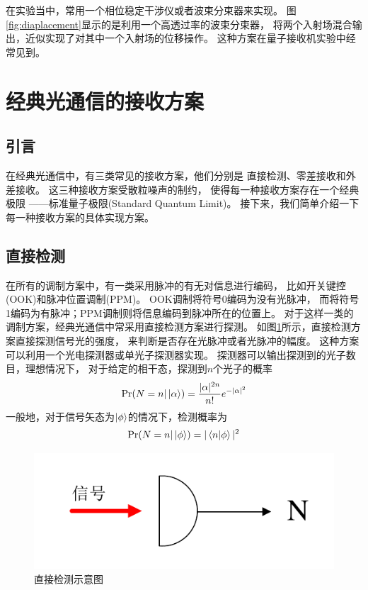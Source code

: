 在实验当中，常用一个相位稳定干涉仪或者波束分束器来实现\cite{cook2007optical,becerra2013experimental,lau2006binary,paris1996displacement}。
图\ref{fig:diaplacement}显示的是利用一个高透过率的波束分束器，
将两个入射场混合输出，近似实现了对其中一个入射场的位移操作。
这种方案在量子接收机实验中经常见到。

\section{经典光通信的接收方案}

\subsection{引言}
在经典光通信中，有三类常见的接收方案，他们分别是
直接检测、零差接收和外差接收。
这三种接收方案受散粒噪声的制约，
使得每一种接收方案存在一个经典极限
——标准量子极限(Standard Quantum Limit)。
接下来，我们简单介绍一下每一种接收方案的具体实现方案。

\subsection{直接检测}

在所有的调制方案中，有一类采用脉冲的有无对信息进行编码，
比如开关键控(OOK)和脉冲位置调制(PPM)。
OOK调制将符号0编码为没有光脉冲，
而将符号1编码为有脉冲；PPM调制则将信息编码到脉冲所在的位置上。
对于这样一类的调制方案，经典光通信中常采用直接检测方案进行探测。
如图\ref{fig:DD}所示，直接检测方案直接探测信号光的强度，
来判断是否存在光脉冲或者光脉冲的幅度\cite{gagliardi1976optical,gagliardi1998optical}。
这种方案可以利用一个光电探测器或单光子探测器实现。
探测器可以输出探测到的光子数目，理想情况下，
对于给定的相干态，探测到$n$个光子的概率
\begin{equation}
\Pr(N = n| \ket{\alpha}) = \frac{|\alpha|^{2n}}{n!} e^{-|\alpha|^2}
\label{eq:dd-prob}
\end{equation}
一般地，对于信号矢态为$\ket{\phi}$的情况下，检测概率为
\begin{equation}
\Pr(N = n| \ket{\phi}) = |\bra{n}\ket{\phi}|^2
\end{equation}



\begin{figure}
\centering
  \includegraphics[scale=1]{figures/chap2/DD.pdf}
  \caption{直接检测示意图}
  \label{fig:DD}
\end{figure}



